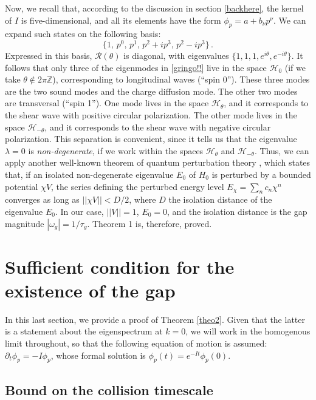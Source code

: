 \documentclass[a4paper, amsfonts, amssymb, amsmath, reprint, showkeys, nofootinbib, twoside, onecolumn,notitlepage]{revtex4-2}
\theoremstyle{definition}
\theoremstyle{theorem}
\theoremstyle{corollary}
\begin{document}
Now, we recall that, according to the discussion in section \ref{backhere}, the kernel of $I$ is five-dimensional, and all its elements have the form $\phi_p=a+b_\nu p^\nu$. We can expand such states on the following basis:
\begin{equation}
    \{1, \, p^0, \, p^1, \, p^2{+}ip^3, \, p^2{-}ip^3 \} \, .
\end{equation}
Expressed in this basis, $\mathcal{R}(\theta)$ is diagonal, with eigenvalues $\{1,1,1,e^{i\theta},e^{-i\theta}\}$. It follows that only three of the eigenmodes in \eqref{gringo!!} live in the space $\mathcal{H}_0$  (if we take $\theta \notin 2\pi \mathbb{Z}$), corresponding to longitudinal waves (``spin 0''). These three modes are the two sound modes and the charge diffusion mode. The other two modes are transversal (``spin 1''). One mode lives in the space $\mathcal{H}_\theta$, and it corresponds to the shear wave with positive circular polarization. The other mode lives in the space $\mathcal{H}_{-\theta}$, and it corresponds to the shear wave with negative circular polarization. This separation is convenient, since it tells us that the eigenvalue $\lambda=0$ is \textit{non-degenerate}, if we work within the spaces $\mathcal{H}_\theta$ and $\mathcal{H}_{-\theta}$. Thus, we can apply another well-known theorem of quantum perturbation theory \cite{KatoAmazing1949}, which states that, if an isolated non-degenerate eigenvalue $E_0$ of $H_0$ is perturbed by a bounded potential $\chi V$, the series defining the perturbed energy level $E_\chi=\sum_n c_n \chi^n$ converges as long as $||\chi V|| <D/2$, where $D$ the isolation distance of the eigenvalue $E_0$. In our case, $||V||=1$, $E_0=0$, and the isolation distance is the gap magnitude $|\omega_g|=1/\tau_g$. Theorem 1 is, therefore, proved.


\section{Sufficient condition for the existence of the gap}\label{thegappone}

In this last section, we provide a proof of Theorem \ref{theo2}. Given that the latter is a statement about the eigenspectrum at $k=0$, we will work in the homogenous limit throughout, so that the following equation of motion is assumed: $\partial_t \phi_p=-I\phi_p$, whose formal solution is $\phi_p(t)=e^{-It}\phi_p(0)$.

\subsection{Bound on the collision timescale}
\end{document}
